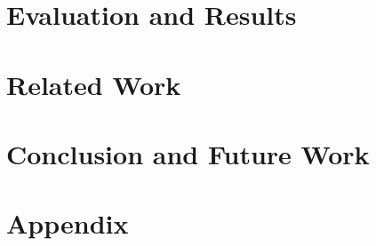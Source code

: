 \chapter{Evaluation and Results} \label{Evaluation and Results}


\chapter{Related Work} \label{Related work}


\chapter{Conclusion and Future Work} \label{Conclusion and Future Work}


\cleardoublepage
\printbibliography[heading=bibintoc]

\cleardoublepage
\pagestyle{headings}  %
\appendix


\renewcommand{\thechapter}{}        %
\chapter*{Appendix}

\renewcommand{\thechapter}{A}
\setcounter{chapter}{1}  %
\setcounter{section}{0}
\setcounter{figure}{0}

